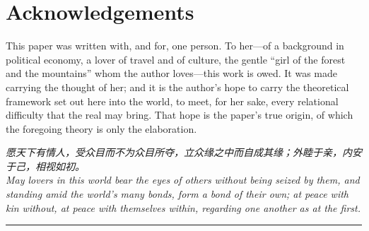 \documentclass[11pt,a4paper]{article}
\newcommand{\goldrule}{\noindent\textcolor{gold}{\rule{\linewidth}{0.6pt}}\par\vspace{0.4em}}
\begin{document}
\newpage
\section*{\textcolor{rosedeep}{Acknowledgements}}

This paper was written with, and for, one person. To her---of a background in political economy, a lover of travel and of culture, the gentle ``girl of the forest and the mountains'' whom the author loves---this work is owed. It was made carrying the thought of her; and it is the author's hope to carry the theoretical framework set out here into the world, to meet, for her sake, every relational difficulty that the real may bring. That hope is the paper's true origin, of which the foregoing theory is only the elaboration.

\vspace{1.2em}
\begin{center}
\begin{minipage}{0.8\linewidth}
\centering
{\cjk\itshape\color{rose}
愿天下有情人，受众目而不为众目所夺，立众缘之中而自成其缘；外睦于亲，内安于己，相视如初。}\\[0.8em]
{\itshape\color{rose}
May lovers in this world bear the eyes of others without being seized by them, and standing amid the world's many bonds, form a bond of their own; at peace with kin without, at peace with themselves within, regarding one another as at the first.}
\end{minipage}
\end{center}

\newpage
\goldrule
{\color{rose}
\renewcommand{\refname}{\textcolor{rosedeep}{References}}
\small
\printbibliography[heading=bibintoc]
}
\end{document}
